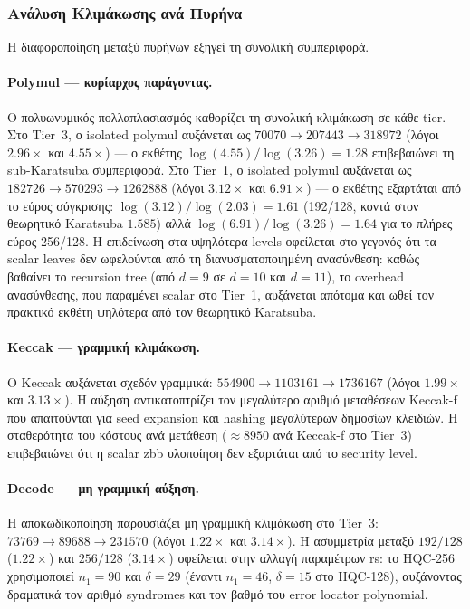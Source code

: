 \subsubsection{Ανάλυση Κλιμάκωσης ανά Πυρήνα}
\label{ssec:scaling-per-kernel}

Η διαφοροποίηση μεταξύ πυρήνων εξηγεί τη συνολική συμπεριφορά.

\paragraph{Polymul — κυρίαρχος παράγοντας.}
Ο πολυωνυμικός πολλαπλασιασμός καθορίζει τη συνολική κλιμάκωση σε κάθε
tier. Στο Tier~3, ο isolated polymul αυξάνεται ως $\num{70070} \to
\num{207443} \to \num{318972}$ (λόγοι $2.96\times$ και $4.55\times$) —
ο εκθέτης $\log(4.55)/\log(3.26) = 1.28$ επιβεβαιώνει τη sub-Karatsuba
συμπεριφορά. Στο Tier~1, ο isolated polymul αυξάνεται ως $\num{182726} \to
\num{570293} \to \num{1262888}$ (λόγοι $3.12\times$ και $6.91\times$) — ο
εκθέτης εξαρτάται από το εύρος σύγκρισης: $\log(3.12)/\log(2.03) = 1.61$
(192/128, κοντά στον θεωρητικό Karatsuba $1.585$) αλλά
$\log(6.91)/\log(3.26) = 1.64$ για το πλήρες εύρος 256/128.
Η επιδείνωση στα υψηλότερα levels οφείλεται στο γεγονός ότι τα scalar
 leaves δεν ωφελούνται από τη διανυσματοποιημένη ανασύνθεση: καθώς
βαθαίνει το recursion tree (από $d=9$ σε $d=10$ και $d=11$), το
overhead ανασύνθεσης, που παραμένει scalar στο Tier~1, αυξάνεται
απότομα και ωθεί τον πρακτικό εκθέτη ψηλότερα από τον θεωρητικό Karatsuba.

\paragraph{Keccak — γραμμική κλιμάκωση.}
Ο Keccak αυξάνεται σχεδόν γραμμικά: $\num{554900} \to \num{1103161} \to
\num{1736167}$ (λόγοι $1.99\times$ και $3.13\times$). Η αύξηση
αντικατοπτρίζει τον μεγαλύτερο αριθμό μεταθέσεων Keccak-f που
απαιτούνται για seed expansion και hashing μεγαλύτερων δημοσίων κλειδιών.
Η σταθερότητα του κόστους ανά μετάθεση ($\approx \num{8950}$ \instret
ανά Keccak-f στο Tier~3) επιβεβαιώνει ότι η scalar \gls{zbb}
υλοποίηση δεν εξαρτάται από το security level.

\paragraph{Decode — μη γραμμική αύξηση.}
Η αποκωδικοποίηση παρουσιάζει μη γραμμική κλιμάκωση στο Tier~3:
$\num{73769} \to \num{89688} \to \num{231570}$ (λόγοι $1.22\times$ και
$3.14\times$). Η ασυμμετρία μεταξύ $192/128$ ($1.22\times$) και
$256/128$ ($3.14\times$) οφείλεται στην αλλαγή παραμέτρων \gls{rs}:
το HQC-256 χρησιμοποιεί $n_1 = 90$ και $\delta = 29$ (έναντι $n_1 = 46$,
$\delta = 15$ στο HQC-128), αυξάνοντας δραματικά τον αριθμό syndromes
και τον βαθμό του error locator polynomial.

